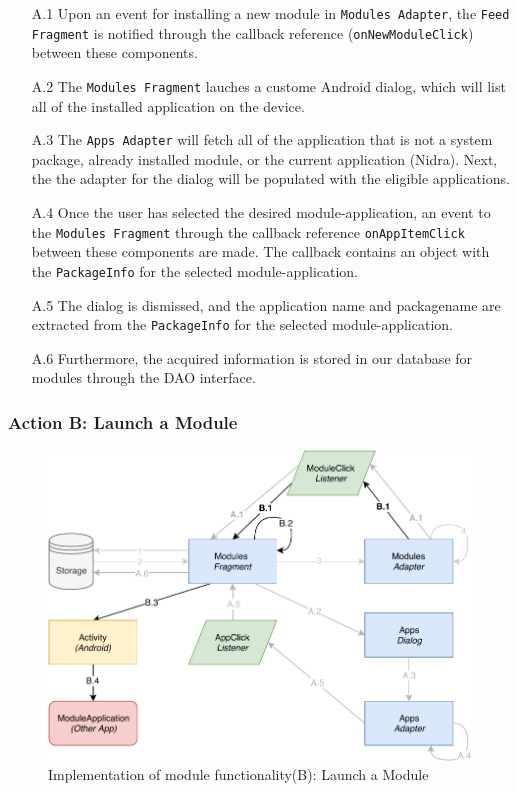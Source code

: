 \begin{itemize}
    \item[A.1] Upon an event for installing a new module in \verb|Modules Adapter|, the \verb|Feed Fragment| is notified through the callback reference (\verb|onNewModuleClick|) between these components.
    \item[A.2] The \verb|Modules Fragment| lauches a custome Android dialog, which will list all of the installed application on the device. 
    \item[A.3] The \verb|Apps Adapter| will fetch all of the application that is not a system package, already installed module, or the current application (Nidra). Next, the the adapter for the dialog will be populated with the eligible applications. 
    \item[A.4] Once the user has selected the desired module-application, an event to the \verb|Modules Fragment| through the callback reference \verb|onAppItemClick| between these components are made. The callback contains an object with the \verb|PackageInfo| for the selected module-application.
    \item[A.5] The dialog is dismissed, and the application name and packagename are extracted from the \verb|PackageInfo| for the selected module-application. 
    \item[A.6] Furthermore, the acquired information is stored in our database for modules through the DAO interface. 
\end{itemize}

\subsubsection{Action B: Launch a Module}
\begin{figure}
    \centering
    \includegraphics[scale=0.7]{images/Module_ImpB.pdf}
    \caption{Implementation of module functionality(B): Launch a Module}
    \label{fig:impl_modulesC}
\end{figure}

